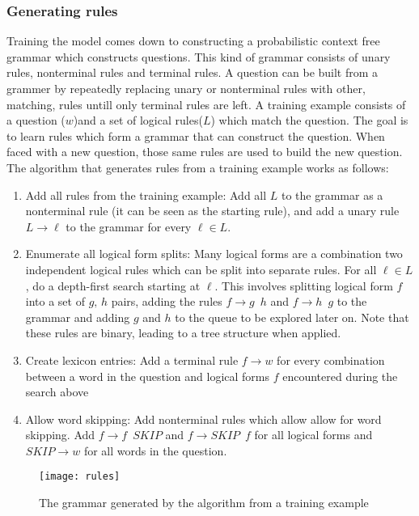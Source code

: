 \subsubsection{Generating rules}
Training the model comes down to constructing a probabilistic context free grammar which constructs questions. This kind of grammar consists of unary rules, nonterminal rules and terminal rules. A question can be built from a grammer by repeatedly replacing unary or nonterminal rules with other, matching, rules untill only terminal rules are left. A training example consists of a question ($w$)and a set of logical rules($L$) which match the question. The goal is to learn rules which form a grammar that can construct the question. When faced with a new question, those same rules are used to build the new question. The algorithm that generates rules from a training example works as follows:
\begin{enumerate}
\item Add all rules from the training example: Add all $L$ to the grammar as a nonterminal rule (it can be seen as the starting rule), and add a unary rule $ L \rightarrow \ell $ to the grammar for every $\ell \in L$.
\item Enumerate all logical form splits: Many logical forms are a combination two independent logical rules which can be split into separate rules. For all $\ell \in L$, do a depth-first search starting at $\ell$. This involves splitting logical form $f$ into a set of $g,\, h$ pairs, adding the rules $ f \rightarrow g \enspace h$ and $ f \rightarrow h \enspace g$ to the grammar and adding $g$ and $h$ to the queue to be explored later on. Note that these rules are binary, leading to a tree structure when applied.
\item Create lexicon entries: Add a terminal rule $ f \rightarrow w$ for every combination between a word in the question and logical forms $f$ encountered during the search above
\item Allow word skipping: Add nonterminal rules which allow allow for word skipping. Add $ f \rightarrow f \enspace SKIP$ and $ f \rightarrow SKIP \enspace f$ for all logical forms and $ SKIP \rightarrow w$ for all words in the question.
\end{enumerate}

\begin{figure}

\texttt{[image: rules]}
\caption{The grammar generated by the algorithm from a training example}\label{fig:rules}
\end{figure}

